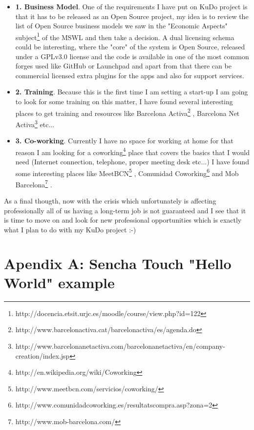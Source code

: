 \documentclass[a4paper,12pt]{book}
\begin{document}
\begin{itemize}
 \item \textbf{1. Business Model}. One of the requirements I have put on KuDo project is that it has to be  released as an Open Source project, my idea is to review the list of Open Source business models we saw in the "Economic Aspects" subject\footnote{http://docencia.etsit.urjc.es/moodle/course/view.php?id=122}  of the MSWL and then take a decision. A dual licensing schema could be interesting, where the "core" of the system is Open Source, released under a GPLv3.0 license and the code is available in one of the most common forges used like GitHub or Launchpad and apart from that there can be commercial licensed extra plugins for the apps and also for support services.
 \item \textbf{2. Training}. Because this is the first time I am setting a start-up I am going to look for some training on this matter, I have found several interesting places to get training and resources like Barcelona Activa\footnote{http://www.barcelonactiva.cat/barcelonactiva/es/agenda.do} , Barcelona Net Activa\footnote{http://www.barcelonanetactiva.com/barcelonanetactiva/en/company-creation/index.jsp} etc...
 \item \textbf{3. Co-working}. Currently I have no space for working at home for that reason I am looking for a coworking\footnote{http://en.wikipedia.org/wiki/Coworking} place that covers the basics that I would need (Internet connection, telephone, proper meeting desk etc...) I have found some interesting places like MeetBCN\footnote{http://www.meetbcn.com/servicios/coworking/} , Comunidad Coworking\footnote{http://www.comunidadcoworking.es/resultatscompra.asp?zona=2}  and Mob Barcelona\footnote{http://www.mob-barcelona.com/} .
\end{itemize}

As a final thougth, now with the crisis which unfortunately is affecting professionally all of us having a long-term job is not guaranteed and I see that it is time to move on and look for new professional opportunities which is exactly what I plan to do with my KuDo project :-)


\chapter{Apendix A: Sencha Touch "Hello World" example}
\label{Apendix A: Sencha Touch "Hello World" example}
\end{document}
